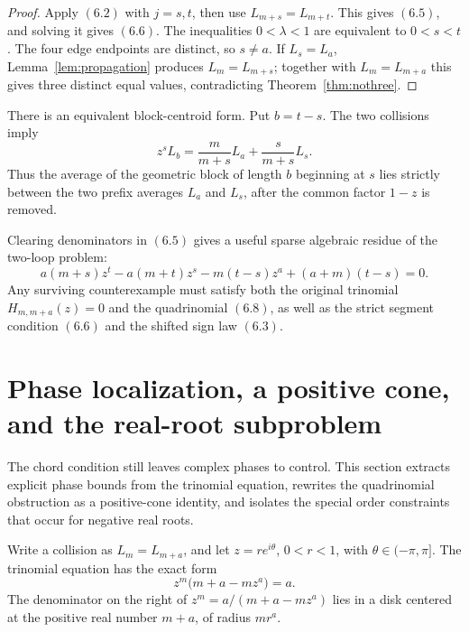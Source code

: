 \documentclass[11pt]{article}
\theoremstyle{definition}
\begin{document}
\begin{proof}
Apply \((6.2)\) with \(j=s,t\), then use
\(L_{m+s}=L_{m+t}\).  This gives \((6.5)\), and solving it gives
\((6.6)\).  The inequalities \(0<\lambda<1\) are equivalent to \(0<s<t\).
The four edge endpoints are distinct, so \(s\neq a\).  If
\(L_s=L_a\), Lemma~\ref{lem:propagation} produces
\(L_m=L_{m+s}\); together with \(L_m=L_{m+a}\) this gives three
distinct equal values, contradicting Theorem~\ref{thm:nothree}.
\end{proof}

There is an equivalent block-centroid form.  Put \(b=t-s\).  The two
collisions imply
\begin{equation}
 z^sL_b
 =\frac{m}{m+s}L_a+\frac{s}{m+s}L_s.
 \tag{6.7}
\end{equation}
Thus the average of the geometric block of length \(b\) beginning at \(s\)
lies strictly between the two prefix averages \(L_a\) and \(L_s\), after the
common factor \(1-z\) is removed.

Clearing denominators in \((6.5)\) gives a useful sparse algebraic residue of
the two-loop problem:
\begin{equation}
 a(m+s)z^t-a(m+t)z^s-m(t-s)z^a+(a+m)(t-s)=0.
 \tag{6.8}
\end{equation}
Any surviving counterexample must satisfy both the original trinomial
\(H_{m,m+a}(z)=0\) and the quadrinomial \((6.8)\), as well as the strict
segment condition \((6.6)\) and the shifted sign law \((6.3)\).

\section{Phase localization, a positive cone, and the real-root subproblem}
\label{sec:phase}

The chord condition still leaves complex phases to control.  This section extracts explicit phase bounds from the trinomial equation, rewrites the quadrinomial obstruction as a positive-cone identity, and isolates the special order constraints that occur for negative real roots.

Write a collision as \(L_m=L_{m+a}\), and let
\(z=re^{i\theta}\), \(0<r<1\), with \(\theta\in(-\pi,\pi]\).
The trinomial equation has the exact form
\begin{equation}
 z^m\bigl(m+a-mz^a\bigr)=a.
 \tag{7.1}
\end{equation}
The denominator on the right of
\(z^m=a/(m+a-mz^a)\) lies in a disk centered at the positive real number
\(m+a\), of radius \(mr^a\).
\end{document}

